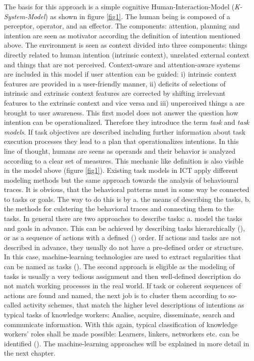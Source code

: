 The basis for this approach is a simple cognitive Human-Interaction-Model (\textit{K-System-Model}) as shown in figure \ref{fig1}. The human being is composed of a perceptor, operator, and an effector. The components: attention, planning and intention are seen as motivator according the definition of intention mentioned above. The environment is seen as context divided into three components: things directly related to human intention (intrinsic context), unrelated external context and things that are not perceived. Context-aware and attention-aware systems are included in this model if user attention can be guided: i) intrinsic context features are provided in a user-friendly manner, ii) deficits of selections of intrinsic and extrinsic context features are corrected by shifting irrelevant features to the extrinsic context and vice versa and iii) unperceived things a are brought to user awareness. This first model does not answer the question how intention can be operationalized. Therefore they introduce the term \textit{task} and \textit{task models}. If task objectives are described including further information about task execution processes they lead to a plan that operationalizes intentions.  In this line of thought, humans are seens as operands and their behavior is analyzed according to a clear set of measures. This mechanic like definition is also visible in the model above (figure \ref{fig1}). Existing task models in \ac{ICT} apply different modeling methods but the same approach towards the analysis of behavioural traces. It is obvious, that the behavioral patterns must in some way be connected to tasks or goals. The way to do this is by a. the means of describing the tasks, b. the methods for culstering the behavioral traces and connecting them to the tasks. In general there are two approaches to describe tasks: a. model the tasks and goals in advance. This can be achieved by describing tasks hierarchically (\cite{newell1972human}), or as a sequence of actions with a defined (\cite{eder1995workflow}) order. If actions and tasks are not described in advance, they usually do not have a pre-defined order or structure. In this case, machine-learning technologies are used to extract regularities that can be named as tasks (\cite{schmitz2011contextualized}). The second approach is eligible as the modeling of tasks is usually a very tedious assignment and then well-defined description do not match working processes in the real world. If task or coherent sequences of actions are found and named, the next job is to cluster them according to so-called activity schemes, that match the higher level descriptions of intentions as typical tasks of knowledge workers: Analise, acquire, disseminate, search and communicate information. With this again, typical classification of knowledge workers' roles shall be made possible: Learners, linkers, networkers etc. can be identified (\cite{reinhardt2011knowledge}). The machine-learning approaches will be explained in more detail in the next chapter. 

